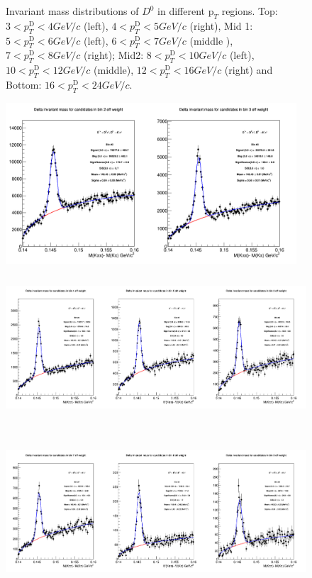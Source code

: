 \begin{enumerate}
\begin{figure}[!htp]
\caption{Invariant mass distributions of $D^0$ in different $\text{p}_T$ regions. Top: $3< p_{T}^{\text{D}}< 4 GeV/c$ (left), $4< p_{T}^{\text{D}}< 5 GeV/c$ (right), Mid 1: $5< p_{T}^{\text{D}}< 6 GeV/c$ (left), $6 < p_{T}^{\text{D}} < 7 GeV/c$ (middle ), $7< p_{T}^{\text{D}}< 8 GeV/c$ (right); Mid2: $8< p_{T}^{\text{D}}< 10GeV/c$ (left), $10< p_{T}^{\text{D}}< 12 GeV/c$ (middle), $12 < p_{T}^{\text{D}}< 16 GeV/c$ (right) and Bottom: $16<p_{T}^{\text{D}}< 24 GeV/c$.}
\label{fig:InvMass}
\end{figure}

\begin{figure}[!htp]
\centering
{\includegraphics[width=1\linewidth, height=6cm]{figures/Dstar_wEFF/InvMassDistributions_Dstar_Bins2to3.png}}
{\includegraphics[width=1\linewidth, height=6cm]{figures/Dstar_wEFF/InvMassDistributions_Dstar_Bins4to6.png}}
{\includegraphics[width=1\linewidth, height=6cm]{figures/Dstar_wEFF/InvMassDistributions_Dstar_Bins7to9.png}}

\end{figure}
\end{enumerate}
